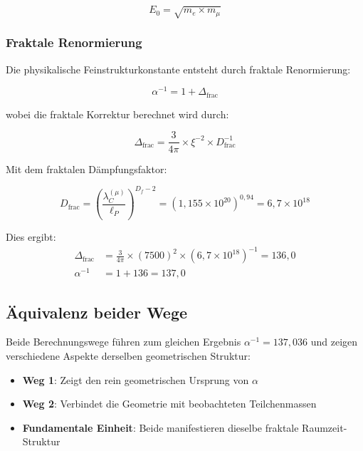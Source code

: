 \documentclass[12pt,a4paper]{article}
\theoremstyle{definition}
\begin{document}
	\begin{equation}
		E_0 = \sqrt{m_e \times m_{\mu}}
	\end{equation}
	
	\subsubsection{Fraktale Renormierung}
	
	Die physikalische Feinstrukturkonstante entsteht durch fraktale Renormierung:
	
	\begin{equation}
		\alpha^{-1} = 1 + \Delta_{\text{frac}}
	\end{equation}
	
	wobei die fraktale Korrektur berechnet wird durch:
	
	\begin{equation}
		\Delta_{\text{frac}} = \frac{3}{4\pi} \times \xi^{-2} \times D_{\text{frac}}^{-1}
	\end{equation}
	
	Mit dem fraktalen Dämpfungsfaktor:
	
	\begin{equation}
		D_{\text{frac}} = \left(\frac{\lambda_C^{(\mu)}}{\ell_P}\right)^{D_f - 2} = \left(1{,}155 \times 10^{20}\right)^{0{,}94} = 6{,}7 \times 10^{18}
	\end{equation}
	
	Dies ergibt:
	\begin{align}
		\Delta_{\text{frac}} &= \frac{3}{4\pi} \times (7500)^2 \times (6{,}7 \times 10^{18})^{-1} = 136{,}0 \\
		\alpha^{-1} &= 1 + 136 = 137{,}0
	\end{align}
	
	\subsection{Äquivalenz beider Wege}
	
	Beide Berechnungswege führen zum gleichen Ergebnis $\alpha^{-1} = 137{,}036$ und zeigen verschiedene Aspekte derselben geometrischen Struktur:
	
	\begin{itemize}
		\item \textbf{Weg 1}: Zeigt den rein geometrischen Ursprung von $\alpha$
		\item \textbf{Weg 2}: Verbindet die Geometrie mit beobachteten Teilchenmassen
		\item \textbf{Fundamentale Einheit}: Beide manifestieren dieselbe fraktale Raumzeit-Struktur
	\end{itemize}
	
\end{document}
